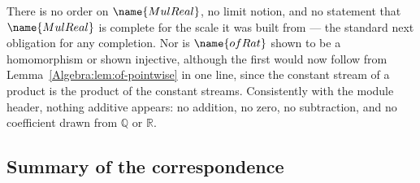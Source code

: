 \begin{remark}\label{Algebra:rem:absent}
There is no order on $\name{MulReal}$, no limit notion, and no statement that
$\name{MulReal}$ is complete for the scale it was built from --- the standard
next obligation for any completion.  Nor is $\name{ofRat}$ shown to be a
homomorphism or shown injective, although the first would now follow from
Lemma~\ref{Algebra:lem:of-pointwise} in one line, since the constant stream of
a product is the product of the constant streams.  Consistently with the
module header, nothing additive appears: no addition, no zero, no subtraction,
and no coefficient drawn from $\mathbb{Q}$ or $\mathbb{R}$.
\end{remark}

\subsection*{Summary of the correspondence}

